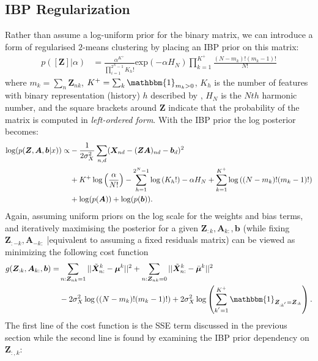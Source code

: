 \documentclass{article}
\numberwithin{equation}{section}
\numberwithin{thm}{section}
\def\IBP{\boldsymbol{Z}}
\def\Weights{\boldsymbol{A}}
\def\Data{\boldsymbol{X}}
\def\data{x}
\def\Residuals{\tilde{\boldsymbol{X}}}
\def\IBPPrior{\alpha}
\def\bias{\boldsymbol{b}}
\def\centre{\boldsymbol{\mu}}
\def\SigData{\sigma_X}
\def\sumIBP{m}
\begin{document}
\subsection{IBP Regularization}
Rather than assume a log-uniform prior for the binary matrix, we can introduce a form of regularised $2$-means clustering by placing an IBP prior on this matrix:
\begin{align}
p([\IBP]|\IBPPrior) &=  \frac{\IBPPrior^{K^+}}{\prod_{i=1}^{2^N-1}K_h!}\text{exp}(-\IBPPrior H_N)\prod_{k=1}^{K^+}\frac{(N-\sumIBP_k)!(\sumIBP_k - 1)!}{N!}
\end{align}
where $\sumIBP_k=\sum_n \IBP_{nk}$, $K^+ = \sum_k  \mathbbm{1}_{ \sumIBP_k > 0}$, $K_h$ is the number of features with binary representation (history) $h$ described by \citet{Griffiths2011}, $H_N$ is the $Nth$ harmonic number, and the square brackets around $\IBP$ indicate that the probability of the matrix is computed in \textit{left-ordered form}. With the IBP prior the log posterior becomes:
%
\begin{align}
 \log(p(\IBP, \Weights, \bias|\data)) \propto & - \frac{1}{2\SigData^2} \sum_{n,d}(\Data_{nd} - (\IBP\Weights)_{nd} - \bias_d)^2 \notag \\
 & + K^+ \log\left(\frac{\IBPPrior}{N!}\right)- \sum_{h=1}^{2^N-1} \log\left(K_h!\right) -\IBPPrior H_N + \sum_{k=1}^{K^+}\log\left((N-\sumIBP_k)!(\sumIBP_k - 1)!\right) \notag \\ 
 & + \log(p(\Weights)) + \log(p(\bias)).
\end{align}
%
Again, assuming uniform priors on the log scale for the weights and bias terms, and iteratively maximising the posterior for a given $\IBP_{:k}, \Weights_{k:}, \bias$  (while fixing $\IBP_{:-k}, \Weights_{-k:}$ |equivalent to assuming a fixed residuals matrix) can be viewed as minimizing the following cost function 
%
\begin{align}
g(\IBP_{:k}, \Weights_{k:}, \bias) = & \sum_{n: \IBP_{nk} = 1}||\Residuals^k_{n:} - \centre^k||^2 + \sum_{n: \IBP_{nk} = 0}||\Residuals^k_{n:} - \bar{\centre}^k||^2  \notag \\ 
& - 2\SigData^2 \log\left((N-\sumIBP_k)!(\sumIBP_k - 1)!\right) + 2\SigData^2 \log\left(\sum_{k^{'}=1}^{K^{+}} \mathbbm{1}_{\IBP_{:k^{'}} = \IBP_{:k}}\right)   \label{eq_IBPcostfun}.
\end{align}
%
The first line of the cost function is the SSE term discussed in the previous section while the second line is found by examining the IBP prior dependency on $\IBP_{:,k}$:
\end{document}
